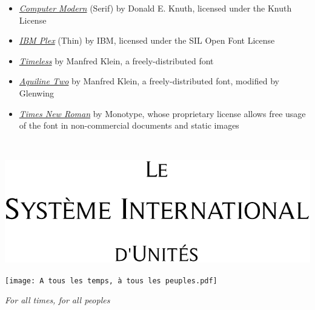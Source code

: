 \documentclass[a4paper]{article}
\renewcommand{\,}{\hspace{0.2em}} %
\begin{document}
\begin{itemize}
\setlength\itemsep{0.25em}
\item{\textsl{\href{https://www.ctan.org/tex-archive/fonts/cm/}{Computer Modern}} (Serif) by Donald E. Knuth, licensed under the Knuth License}
\item{\textsl{\href{https://github.com/IBM/plex}{IBM Plex}} (Thin) by IBM, licensed under the SIL Open Font License}
\item{\textsl{\href{http://fontpro.com/timeless-font-5159}{Timeless}} by Manfred Klein, a freely-distributed font}
\item{\textsl{\href{http://fontpro.com/aquiline-two-font-3337}{Aquiline Two}} by Manfred Klein, a freely-distributed font, modified by Glenwing}
\item{\textsl{\href{https://catalog.monotype.com/font/monotype/times-new-roman/bold}{Times New Roman}} by Monotype, whose proprietary license allows free usage of the font in non-commercial documents and static images}
\end{itemize}


\setlength\lineskip{1.2em}
\setlength{\parskip}{0em}

\newpage


~
\vspace{2cm}

\begin{center}
\includegraphics{Le Système International d'Unités Timeless.pdf}
\end{center}

\vspace{6cm}

\begin{center}
\texttt{[image: A tous les temps, à tous les peuples.pdf]}
\end{center}

\vspace{2mm}

\begin{center}
\huge\textsl{For all times, for all peoples}
\end{center}
\end{document}
